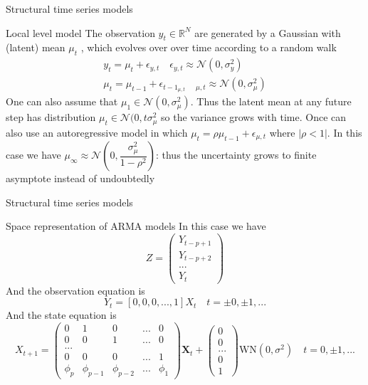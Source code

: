 \documentclass[11pt]{beamer}
\begin{document}
\begin{frame}{Structural time series models \cite{pml2Book}}
\small
\begin{exampleblock}{Local level model}
The observation $y_{t} \in  \mathbb{R}^{N}$ are generated by a Gaussian with (latent) mean $\mu_{t}$ , which evolves over over time according to a random walk 
\begin{equation*}
\begin{split}
y_{t}=\mu_{t}+\epsilon_{y,t} \quad \epsilon_{y,t}\approx \mathcal{N}(0,\sigma_{y}^{2}) \\
\mu_{t}=\mu_{t-1}+\epsilon_{t-1}_{\mu,t} \quad_{\mu,t} \approx  \mathcal{N}(0,\sigma_{\mu}^{2})
\end{split}
\end{equation*}
One can also assume that $\mu_{1} \in  \mathcal{N}(0,\sigma^{2}_{\mu})$. Thus the latent mean at any future step has distribution $\mu_{t} \in  \mathcal{N}(0,t\sigma^{2}_{\mu}$ so the variance grows with time. Once can also use an autoregressive model in which $\mu_{t}=\rho\mu_{t-1}+\epsilon_{\mu,t}$ where $|\rho<1|$. In this case we have $\mu_{\infty}\approx \mathcal{N}(0,\dfrac{\sigma^{2}_{\mu}}{1-\rho^{2}})$: thus the uncertainty grows to finite asymptote instead of undoubtedly
\end{exampleblock}
\end{frame}

\begin{frame}{Structural time series models \cite{pml2Book}}
\small
\begin{exampleblock}{Space representation of ARMA models}
In this case we have 
\begin{equation}
Z= \begin{pmatrix} Y_{t-p+1} \\ Y_{t-p+2}  \\ ... \\ Y_{t} \end{pmatrix}
\end{equation}
And the observation equation is
\begin{equation}
Y_{t}=[0,0,0,...,1]X_{t} \quad t=\pm 0,\pm 1,...
\end{equation}
And the state equation is 
\begin{equation}
X_{t+1}= \begin{pmatrix} 0 & 1 &  0 &... & 0 \\ 0 & 0 & 1 & ... & 0  \\ ... \\ 0 & 0  & 0 & ... & 1 \\ \phi_{p} & \phi_{p-1} & \phi_{p-2} & ... & \phi_{1} \end{pmatrix} \bm{X}_{t}+ \begin{pmatrix} 0 \\ 0 \\... \\ 0 \\ 1 \end{pmatrix}\textrm{WN}(0,\sigma^{2}) \quad t=0,\pm{1},...
\end{equation}
\end{exampleblock}
\end{frame}
\end{document}
